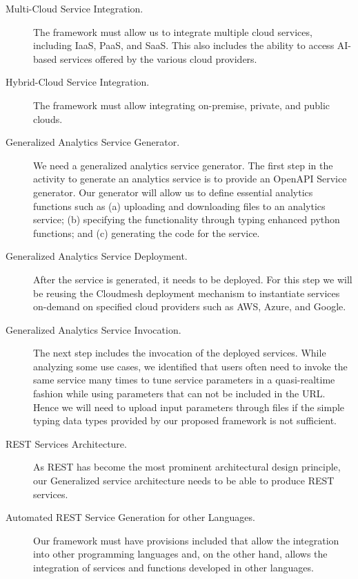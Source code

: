 \begin{description}

\item[Multi-Cloud Service Integration.] The framework must allow us to integrate multiple cloud services, including IaaS, PaaS, and SaaS. This also includes the ability to access AI-based services offered by the various cloud providers.

\item[Hybrid-Cloud Service Integration.] The framework must allow integrating on-premise, private, and public clouds.


\item[Generalized Analytics Service Generator.] We need a generalized analytics service generator. The first step in the activity to generate an analytics service is to
provide an OpenAPI Service generator. Our generator will allow us to
define essential analytics functions such as (a) uploading and
downloading files to an analytics service; (b) specifying the
functionality through typing enhanced python functions; and (c)
generating the code for the service.

\item[Generalized Analytics Service Deployment.] After the service is generated, it needs to be deployed. For this step
we will be reusing the Cloudmesh deployment mechanism to instantiate
services on-demand on specified cloud providers such as AWS, Azure,
and Google. 

\item[Generalized Analytics Service Invocation.] The next step includes the invocation of the deployed services. While
analyzing some use cases, we identified that users often need to
invoke the same service many times to tune service parameters in a
quasi-realtime fashion while using parameters that can not be included in the URL. Hence we will need to upload input parameters through
files if the simple typing data types provided by our proposed
framework is not sufficient. 

\item[REST Services Architecture.] As REST has become the most prominent architectural design principle, our Generalized service architecture needs to be able to produce REST services.

\item[Automated REST Service Generation for other Languages.] Our framework must have provisions included that allow the integration into other programming languages and, on the other hand, allows the integration of services and functions developed in other languages.



\end{description}
